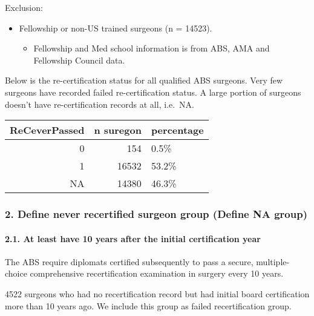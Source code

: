\documentclass[
]{article}
\providecommand{\tightlist}{%
  \setlength{\itemsep}{0pt}\setlength{\parskip}{0pt}}
\begin{document}
Exclusion:

\begin{itemize}
\tightlist
\item
  Fellowship or non-US trained surgeons (n = 14523).

  \begin{itemize}
  \tightlist
  \item
    Fellowship and Med school information is from ABS, AMA and
    Fellowship Council data.
  \end{itemize}
\end{itemize}

Below is the re-certification status for all qualified ABS surgeons.
Very few surgeons have recorded failed re-certification status. A large
portion of surgeons doesn't have re-certification records at all,
i.e.~NA.

\begin{table}[H]
\centering
\begin{tabular}{r|r|l}
\hline
ReCeverPassed & n suregon & percentage\\
\hline
0 & 154 & 0.5\%\\
\hline
1 & 16532 & 53.2\%\\
\hline
NA & 14380 & 46.3\%\\
\hline
\end{tabular}
\end{table}

\hypertarget{define-never-recertified-surgeon-group-define-na-group}{%
\subsubsection{2. Define never recertified surgeon group (Define NA
group)}\label{define-never-recertified-surgeon-group-define-na-group}}

\hypertarget{at-least-have-10-years-after-the-initial-certification-year}{%
\paragraph{2.1. At least have 10 years after the initial certification
year}\label{at-least-have-10-years-after-the-initial-certification-year}}

The ABS require diplomats certified subsequently to pass a secure,
multiple-choice comprehensive recertification examination in surgery
every 10 years.

4522 surgeons who had no recertification record but had initial board
certification more than 10 years ago. We include this group as failed
recertification group.
\end{document}

